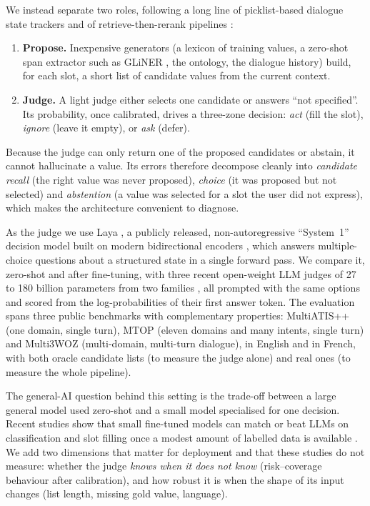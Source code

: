 We instead separate two roles, following a long line of picklist-based dialogue state trackers \citep{lee2019sumbt,zhang2020dsdst} and of retrieve-then-rerank pipelines \citep{wu2020blink}:
\begin{enumerate}
  \item \textbf{Propose.} Inexpensive generators (a lexicon of training values, a zero-shot span extractor such as GLiNER \citep{zaratiana2024gliner}, the ontology, the dialogue history) build, for each slot, a short list of candidate values from the current context.
  \item \textbf{Judge.} A light judge either selects one candidate or answers ``not specified''. Its probability, once calibrated, drives a three-zone decision: \emph{act} (fill the slot), \emph{ignore} (leave it empty), or \emph{ask} (defer).
\end{enumerate}
Because the judge can only return one of the proposed candidates or abstain, it cannot hallucinate a value. Its errors therefore decompose cleanly into \emph{candidate recall} (the right value was never proposed), \emph{choice} (it was proposed but not selected) and \emph{abstention} (a value was selected for a slot the user did not express), which makes the architecture convenient to diagnose.

As the judge we use Laya \citep{laya2026}, a publicly released, non-autoregressive ``System~1'' decision model built on modern bidirectional encoders \citep{warner2025modernbert,marone2026mmbert}, which answers multiple-choice questions about a structured state in a single forward pass. We compare it, zero-shot and after fine-tuning, with three recent open-weight LLM judges of 27 to 180 billion parameters from two families \citep{qwen38,qwen38flashnext,gemma4report}, all prompted with the same options and scored from the log-probabilities of their first answer token. The evaluation spans three public benchmarks with complementary properties: MultiATIS++ \citep{xu2020multiatis} (one domain, single turn), MTOP \citep{li2021mtop} (eleven domains and many intents, single turn) and Multi3WOZ \citep{hu2023multi3woz} (multi-domain, multi-turn dialogue), in English and in French, with both oracle candidate lists (to measure the judge alone) and real ones (to measure the whole pipeline).

The general-AI question behind this setting is the trade-off between a large general model used zero-shot and a small model specialised for one decision. Recent studies show that small fine-tuned models can match or beat LLMs on classification and slot filling once a modest amount of labelled data is available \citep{pecher2025comparing,aguirre2025finetuning,rana2025zeroshot}. We add two dimensions that matter for deployment and that these studies do not measure: whether the judge \emph{knows when it does not know} (risk--coverage behaviour after calibration), and how robust it is when the shape of its input changes (list length, missing gold value, language).

